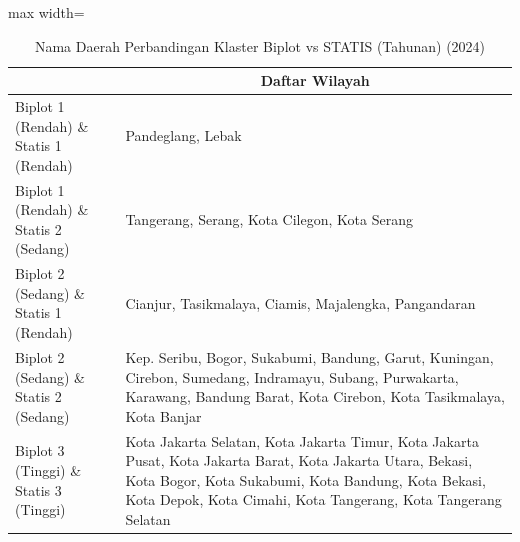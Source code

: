 \begin{table}[H]
\centering
\caption{Nama Daerah Perbandingan Klaster Biplot vs STATIS (Tahunan) (2024)} \label{tab:app2biplot_statis_comp_name_2024}
\begin{adjustbox}{max width=\textwidth}
\begin{tabular}{|>{\centering\arraybackslash}p{4cm}|p{10cm}|}
\hline
\multicolumn{1}{|c|}{\textbf{Kategori}} & \multicolumn{1}{c|}{\textbf{Daftar Wilayah}} \\
\hline
Biplot 1 (Rendah) \& Statis 1 (Rendah) & Pandeglang, Lebak \\
\hline
Biplot 1 (Rendah) \& Statis 2 (Sedang) & Tangerang, Serang, Kota Cilegon, Kota Serang \\
\hline
Biplot 2 (Sedang) \& Statis 1 (Rendah) & Cianjur, Tasikmalaya, Ciamis, Majalengka, Pangandaran \\
\hline
Biplot 2 (Sedang) \& Statis 2 (Sedang) & Kep. Seribu, Bogor, Sukabumi, Bandung, Garut, Kuningan, Cirebon, Sumedang, Indramayu, Subang, Purwakarta, Karawang, Bandung Barat, Kota Cirebon, Kota Tasikmalaya, Kota Banjar \\
\hline
Biplot 3 (Tinggi) \& Statis 3 (Tinggi) & Kota Jakarta Selatan, Kota Jakarta Timur, Kota Jakarta Pusat, Kota Jakarta Barat, Kota Jakarta Utara, Bekasi, Kota Bogor, Kota Sukabumi, Kota Bandung, Kota Bekasi, Kota Depok, Kota Cimahi, Kota Tangerang, Kota Tangerang Selatan \\
\hline
\end{tabular}
\end{adjustbox}
\end{table}